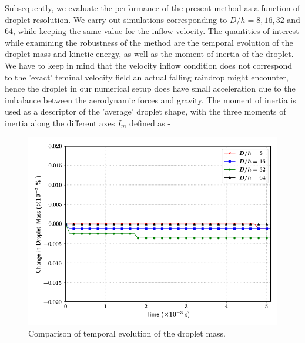 Subsequently, we evaluate the performance of the present method as a function of droplet resolution. We carry out simulations corresponding to $D/h = 8, 16, 32 $ and $64$, while keeping the same value for the inflow velocity. The quantities of interest while examining the robustness of the method are the temporal evolution of the droplet mass and kinetic energy, as well as the moment of inertia of the droplet. We have to keep in mind that the velocity inflow condition does not correspond to the 'exact' teminal velocity field an actual falling raindrop might encounter, hence the droplet in our numerical setup does have small acceleration due to the imbalance between the aerodynamic forces and gravity. The moment of inertia is used as a descriptor of the 'average' droplet shape, with the three moments of inertia along the different axes $I_m$ defined as - 

\begin{figure}
\begin{center}
\includegraphics[scale = 0.5]{Figures/Sagar/drop_mass_ppd.png}
\end{center}
\vspace*{-0.5cm}
\caption{Comparison of temporal evolution of the droplet mass. }
\label{drop_vel}
\end{figure}

